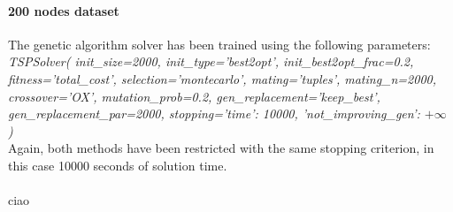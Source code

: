 \documentclass{article}
\begin{document}
\paragraph*{200 nodes dataset}
The genetic algorithm solver has been trained using the following parameters: \\
\newline
\textit{TSPSolver(
    init\_size=2000, init\_type='best2opt', init\_best2opt\_frac=0.2, fitness='total\_cost',
    selection='montecarlo', mating='tuples', mating\_n=2000, crossover='OX', mutation\_prob=0.2,
    gen\_replacement='keep\_best', gen\_replacement\_par=2000,
    stopping={'time': 10000, 'not\_improving\_gen': $+\infty$}
)} \\
\newline
Again, both methods have been restricted with the same stopping criterion, in this case 10000 seconds of solution time.


\paragraph*{\null}
ciao




\newpage


\end{document}
